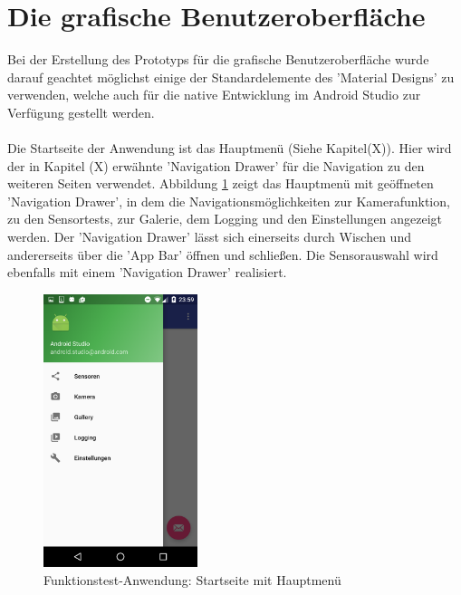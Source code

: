 \section{Die grafische Benutzeroberfläche}

Bei der Erstellung des Prototyps für die grafische Benutzeroberfläche wurde darauf geachtet möglichst einige der Standardelemente des 'Material Designs' zu verwenden, welche auch für die native Entwicklung im Android Studio zur Verfügung gestellt werden.
\\
\\
Die Startseite der Anwendung ist das Hauptmenü (Siehe Kapitel(X)). Hier wird der in Kapitel (X) erwähnte 'Navigation Drawer' für die Navigation zu den weiteren Seiten verwendet. Abbildung \ref{fig:Main_Menu} zeigt das Hauptmenü mit geöffneten 'Navigation Drawer', in dem die Navigationsmöglichkeiten zur Kamerafunktion, zu den Sensortests, zur Galerie, dem Logging und den Einstellungen angezeigt werden. Der 'Navigation Drawer' lässt sich einerseits durch Wischen und andererseits über die 'App Bar' öffnen und schließen. Die Sensorauswahl wird ebenfalls mit einem 'Navigation Drawer' realisiert.

\begin{figure}[h]
	\centering
	\includegraphics[width=0.4\textwidth]{Bilder/Screenshots/Screenshot_20170214-235908.PNG}
	\caption{Funktionstest-Anwendung: Startseite mit Hauptmenü}
	\label{fig:Main_Menu}
\end{figure}

